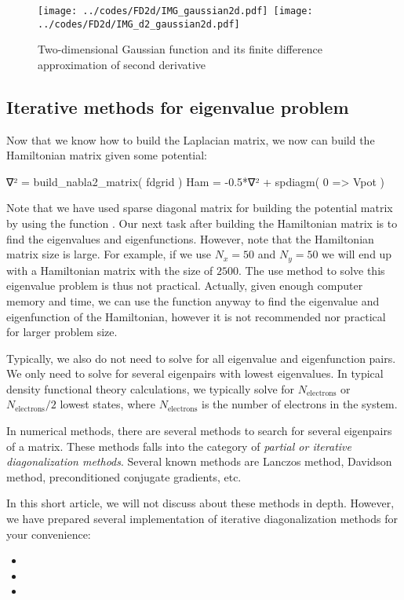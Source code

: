 \begin{figure}[H]
{\center
\texttt{[image: ../codes/FD2d/IMG\_gaussian2d.pdf]}\,%
\texttt{[image: ../codes/FD2d/IMG\_d2\_gaussian2d.pdf]}
\par}
\caption{Two-dimensional Gaussian function and its finite difference
approximation of second derivative}
\label{fig:fd_gaussian_2d}
\end{figure}

\subsection{Iterative methods for eigenvalue problem}

Now that we know how to build the Laplacian matrix, we now can build the Hamiltonian
matrix given some potential:
\begin{juliacode}
∇² = build_nabla2_matrix( fdgrid )
Ham = -0.5*∇² + spdiagm( 0 => Vpot )
\end{juliacode}
Note that we have used sparse diagonal matrix for building the potential matrix by
using the function .
Our next task after building the Hamiltonian matrix is to find the eigenvalues
and eigenfunctions.
However, note that the Hamiltonian matrix size is large.
For example, if we use $N_x=50$ and $N_y=50$ we will end up with a Hamiltonian
matrix with the size of $2500$.
The use  method to solve this eigenvalue problem is thus not practical.
Actually, given enough computer memory and time, we can use the function
 anyway
to find the eigenvalue and eigenfunction of the Hamiltonian, however it is not recommended
nor practical for larger problem size.

Typically, we also do not need to solve for all eigenvalue and eigenfunction pairs.
We only need to solve for several eigenpairs with lowest eigenvalues. In typical density
functional theory calculations, we typically solve for $N_{\mathrm{electrons}}$ or
$N_{\mathrm{electrons}}/2$ lowest states, where $N_{\mathrm{electrons}}$ is the number
of electrons in the system.

In numerical methods, there are several methods to search for several eigenpairs
of a matrix. These methods falls into the category of \textit{partial or iterative
diagonalization methods}. Several known methods are Lanczos method, Davidson method,
preconditioned conjugate gradients, etc.

In this short article, we will not discuss about these methods in depth.
However, we have prepared several implementation of iterative diagonalization methods
for your convenience:
\begin{itemize}
\item {}
\item {}
\item {}
\end{itemize}

